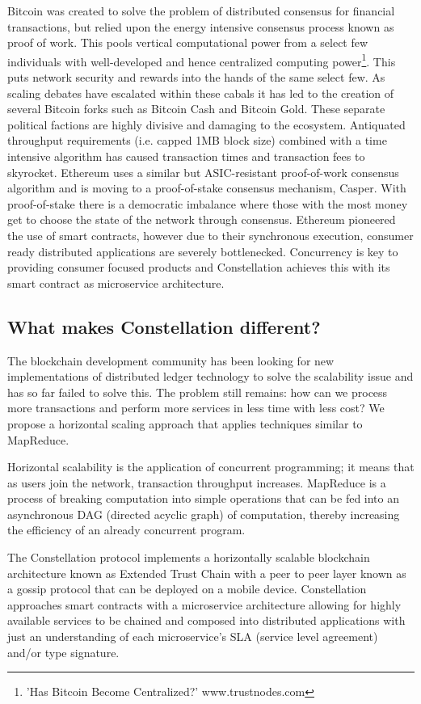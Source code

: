 \documentclass{article}
\begin{document}
Bitcoin was created to solve the problem of distributed consensus for financial transactions, but relied upon the energy intensive consensus process known as proof of work. This pools vertical computational power from a select few individuals with well-developed and hence centralized computing power\footnote{'Has Bitcoin Become Centralized?' www.trustnodes.com}. This puts network security and rewards into the hands of the same select few. As scaling debates have escalated within these cabals it has led to the creation of several Bitcoin forks such as Bitcoin Cash and Bitcoin Gold. These separate political factions are highly divisive and damaging to the ecosystem. Antiquated throughput requirements (i.e. capped 1MB block size) combined with a time intensive algorithm has caused transaction times and transaction fees to skyrocket. Ethereum uses a similar but ASIC-resistant proof-of-work consensus algorithm and is  moving to a proof-of-stake consensus mechanism, Casper.  With proof-of-stake there is a democratic imbalance where those with the most money get to choose the state of the network through consensus. Ethereum pioneered the use of smart contracts, however due to their synchronous execution, consumer ready distributed applications are severely bottlenecked. Concurrency is key to providing consumer focused products and Constellation achieves this with its smart contract as microservice architecture.

\subsection{What makes Constellation different?}
The blockchain development community has been looking for new implementations of distributed ledger technology to solve the scalability issue and has so far failed to solve this. The problem still remains: how can we process more transactions and perform more services in less time with less cost? We propose a horizontal scaling approach that applies techniques similar to MapReduce.  

Horizontal scalability is the application of concurrent programming; it means that as users join the network, transaction throughput increases. MapReduce is a process of breaking computation into simple operations that can be fed into an asynchronous DAG (directed acyclic graph) of computation, thereby increasing the efficiency of an already concurrent program. 

The Constellation protocol implements a horizontally scalable blockchain architecture known as Extended Trust Chain with a peer to peer layer known as a gossip protocol that can be deployed on a mobile device. Constellation approaches smart contracts with a microservice architecture allowing for highly available services to be chained and composed into distributed applications with just an understanding of each microservice's SLA (service level agreement) and/or type signature.
\end{document}
